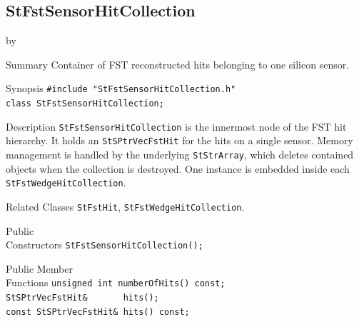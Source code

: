 \documentclass[twoside]{article}
\newcommand{\entrylabel}[1]{\mbox{\textbf{{#1}}}\hfil}%
\newenvironment{entry}
{\begin{list}{}%
    {\renewcommand{\makelabel}{\entrylabel}%
     \setlength{\labelwidth}{90pt}%
     \setlength{\leftmargin}{\labelwidth}
     \advance\leftmargin by \labelsep%
      }%
    }%
  {\end{list}}
\newcommand{\Entrylabel}[1]%
{\raisebox{0pt}[1ex][0pt]{\makebox[\labelwidth][l]%
    {\parbox[t]{\labelwidth}{\hspace{0pt}\textbf{{#1}}}}}}
\newenvironment{Entry}%
{\renewcommand{\entrylabel}{\Entrylabel}\begin{entry}}%
  {\end{entry}}
\begin{document}
\subsection{StFstSensorHitCollection}
\label{sec:StFstSensorHitCollection}
\begin{Entry}
\item[Summary] Container of FST reconstructed hits belonging to one silicon sensor.
\item[Synopsis]
    \verb+#include "StFstSensorHitCollection.h"+\\
    \verb+class StFstSensorHitCollection;+\\
\item[Description]
  \texttt{StFstSensorHitCollection} is the innermost node of the FST hit hierarchy.  It
  holds an \texttt{StSPtrVecFstHit} for the hits on a single sensor.  Memory management
  is handled by the underlying \texttt{StStrArray}, which deletes contained objects when
  the collection is destroyed.  One instance is embedded inside each
  \texttt{StFstWedgeHitCollection}.
\item[Related Classes]
  \texttt{StFstHit}, \texttt{StFstWedgeHitCollection}.
\item[Public\\ Constructors]
    \verb+StFstSensorHitCollection();+\\
\item[Public Member\\ Functions]
    \verb+unsigned int numberOfHits() const;+\\
    \verb+StSPtrVecFstHit&       hits();+\\
    \verb+const StSPtrVecFstHit& hits() const;+\\
\end{Entry}
\clearpage
\end{document}
